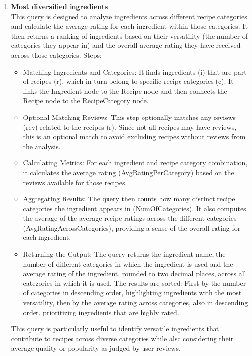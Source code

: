 \begin{enumerate}
    \item {}
          \textbf{Most diversified ingredients}\\
This query is designed to analyze ingredients across different recipe categories and calculate the average rating for each ingredient within those categories. It then returns a ranking of ingredients based on their versatility (the number of categories they appear in) and the overall average rating they have received across those categories.
Steps:
    \begin{itemize}
        \item Matching Ingredients and Categories:
It finds ingredients (i) that are part of recipes (r), which in turn belong to specific recipe categories (c). It links the Ingredient node to the Recipe node and then connects the Recipe node to the RecipeCategory node.
        \item Optional Matching Reviews:
This step optionally matches any reviews (rev) related to the recipes (r). Since not all recipes may have reviews, this is an optional match to avoid excluding recipes without reviews from the analysis.
        \item Calculating Metrics:
For each ingredient and recipe category combination, it calculates the average rating (AvgRatingPerCategory) based on the reviews available for those recipes.
        \item Aggregating Results:
The query then counts how many distinct recipe categories the ingredient appears in (NumOfCategories).
It also computes the average of the average recipe ratings across the different categories (AvgRatingAcrossCategories), providing a sense of the overall rating for each ingredient.
        \item Returning the Output:
The query returns the ingredient name, the number of different categories in which the ingredient is used and the average rating of the ingredient, rounded to two decimal places, across all categories in which it is used.
The results are sorted:
First by the number of categories in descending order, highlighting ingredients with the most versatility, then by the average rating across categories, also in descending order, prioritizing ingredients that are highly rated.
    \end{itemize}
This query is particularly useful to identify versatile ingredients that contribute to recipes across diverse categories while also considering their average quality or popularity as judged by user reviews.

\end{enumerate}
